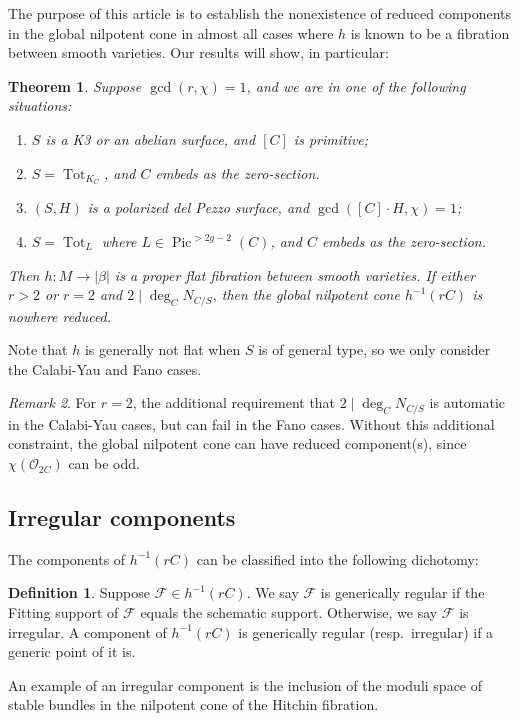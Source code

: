 \documentclass{amsart}
\theoremstyle{plain}
\newtheorem{theorem}{Theorem}[section]
\theoremstyle{definition}
\newtheorem{definition}{Definition}[section]
\theoremstyle{remark}
\newtheorem{remark}[theorem]{Remark}
\begin{document}
The purpose of this article is to establish the nonexistence of reduced components in the global nilpotent cone in almost all cases where $h$ is known to be a fibration between smooth varieties.
Our results will show, in particular:
\begin{theorem}\label{intro:mainthm}
    Suppose $\gcd(r,\chi)=1$, and we are in one of the following situations:
    \begin{enumerate}
        \item[(CY1)] $S$ is a K3 or an abelian surface, and $[C]$ is primitive;
        \item[(CY2)] $S=\operatorname{Tot}_{K_C}$, and $C$ embeds as the zero-section.
        \item[(F1)] $(S,H)$ is a polarized del Pezzo surface, and $\gcd([C]\cdot H,\chi)=1$;
        \item[(F2)] $S=\operatorname{Tot}_L$ where $L\in\operatorname{Pic}^{>2g-2}(C)$, and $C$ embeds as the zero-section.
    \end{enumerate}
    Then $h:M\to |\beta|$ is a proper flat fibration between smooth varieties.
    If either $r>2$ or $r=2$ and $2\mid \deg_C N_{C/S}$, then the global nilpotent cone $h^{-1}(rC)$ is nowhere reduced.
\end{theorem}
Note that $h$ is generally not flat when $S$ is of general type, so we only consider the Calabi-Yau and Fano cases.

\begin{remark}
    For $r=2$, the additional requirement that $2\mid\deg_C N_{C/S}$ is automatic in the Calabi-Yau cases, but can fail in the Fano cases.
    Without this additional constraint, the global nilpotent cone can have reduced component(s), since $\chi(\mathcal O_{2C})$ can be odd.
\end{remark}

\subsection{Irregular components}
The components of $h^{-1}(rC)$ can be classified into the following dichotomy:
\begin{definition}
    Suppose $\mathcal F\in h^{-1}(rC)$.
    We say $\mathcal F$ is generically regular if the Fitting support of $\mathcal F$ equals the schematic support.
    Otherwise, we say $\mathcal F$ is irregular.
    A component of $h^{-1}(rC)$ is generically regular (resp.~irregular) if a generic point of it is.
\end{definition}
An example of an irregular component is the inclusion of the moduli space of stable bundles in the nilpotent cone of the Hitchin fibration.
\end{document}
